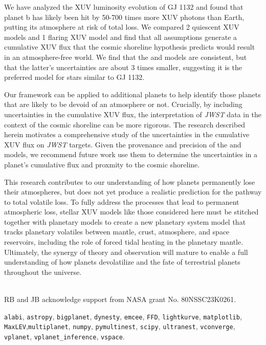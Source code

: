 \documentclass[preprint]{aastex631}
\def\jwst{{\it JWST}\xspace}
\begin{document}
We have analyzed the XUV luminosity evolution of GJ 1132 and found that planet b has likely been hit by 50-700 times more XUV photons than Earth, putting its atmosphere at risk of total loss. We compared 2 quiescent XUV models and 1 flaring XUV model and find that all assumptions generate a cumulative XUV flux that the cosmic shoreline hypothesis predicts would result in an atmosphere-free world. We find that the \citet{Ribas05} and \citet{Engle24} models are consistent, but that the latter's uncertainties are about 3 times smaller, suggesting it is the preferred model for stars similar to GJ 1132.

Our framework can be applied to additional planets to help identify those planets that are likely to be devoid of an atmosphere or not. Crucially, by including uncertainties in the cumulative XUV flux, the interpretation of \jwst data in the context of the cosmic shoreline can be more rigorous. The research described herein motivates a comprehensive study of the uncertainties in the cumulative XUV flux on \jwst targets. Given the provenance and precision of the \citet{EngleGuinan23} and \citet{Engle24} models, we recommend future work use them to determine the uncertainties in a planet's cumulative flux and proxmity to the cosmic shoreline.

This research contributes to our understanding of how planets permanently lose their atmospheres, but does not yet produce a realistic prediction for the pathway to total volatile loss. To fully address the processes that lead to permanent atmospheric loss, stellar XUV models like those considered here must be stitched together with planetary models to create a new planetary system model that tracks planetary volatiles between mantle, crust, atmosphere, and space reservoirs, including the role of forced tidal heating in the planetary mantle. Ultimately, the synergy of theory and observation will mature to enable a full understanding of how planets devolatilize and the fate of terrestrial planets throughout the universe.


\vspace{1cm}

\\
RB and JB acknowledge support from NASA grant No. 80NSSC23K0261.

\vspace{1cm}

 \texttt{alabi}, \texttt{astropy}, \texttt{bigplanet}, \texttt{dynesty}, \texttt{emcee}, \texttt{FFD}, \texttt{lightkurve}, \texttt{matplotlib}, \texttt{MaxLEV},\texttt{multiplanet}, \texttt{numpy}, \texttt{pymultinest}, \texttt{scipy}, \texttt{ultranest}, \texttt{vconverge}, \texttt{vplanet}, \texttt{vplanet\_inference}, \texttt{vspace}.
\end{document}
